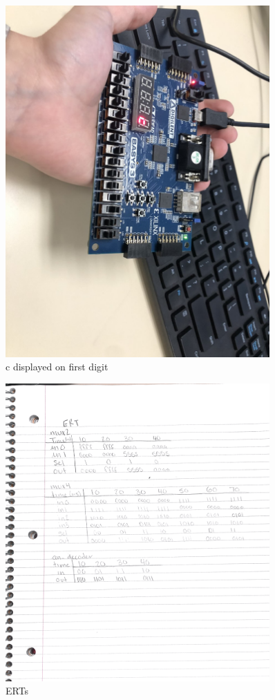 \documentclass[11pt]{article}
\begin{document}
\begin{figure}[ht]\centering 
	\includegraphics[width= 0.9\textwidth]{b11.png}
	\caption{c displayed on first digit}
	\label{fig: pic10}
\end{figure}

\begin{figure}[ht]\centering 
	\includegraphics[width= 0.9\textwidth]{ert.png}
	\caption{ERTs}
	\label{fig: ert}
\end{figure}
\end{document}
